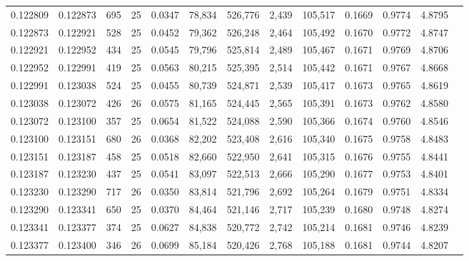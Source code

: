 \begin{tabular}{rrrrrrrrrrrrr}
0.122809 & 0.122873 &   695 &  25 &                                     0.0347 &  78,834 & 526,776 &   2,439 & 105,517 & 0.1669 & 0.9774 & 4.8795 \\
0.122873 & 0.122921 &   528 &  25 &                                     0.0452 &  79,362 & 526,248 &   2,464 & 105,492 & 0.1670 & 0.9772 & 4.8747 \\
0.122921 & 0.122952 &   434 &  25 &                                     0.0545 &  79,796 & 525,814 &   2,489 & 105,467 & 0.1671 & 0.9769 & 4.8706 \\
0.122952 & 0.122991 &   419 &  25 &                                     0.0563 &  80,215 & 525,395 &   2,514 & 105,442 & 0.1671 & 0.9767 & 4.8668 \\
0.122991 & 0.123038 &   524 &  25 &                                     0.0455 &  80,739 & 524,871 &   2,539 & 105,417 & 0.1673 & 0.9765 & 4.8619 \\
0.123038 & 0.123072 &   426 &  26 &                                     0.0575 &  81,165 & 524,445 &   2,565 & 105,391 & 0.1673 & 0.9762 & 4.8580 \\
0.123072 & 0.123100 &   357 &  25 &                                     0.0654 &  81,522 & 524,088 &   2,590 & 105,366 & 0.1674 & 0.9760 & 4.8546 \\
0.123100 & 0.123151 &   680 &  26 &                                     0.0368 &  82,202 & 523,408 &   2,616 & 105,340 & 0.1675 & 0.9758 & 4.8483 \\
0.123151 & 0.123187 &   458 &  25 &                                     0.0518 &  82,660 & 522,950 &   2,641 & 105,315 & 0.1676 & 0.9755 & 4.8441 \\
0.123187 & 0.123230 &   437 &  25 &                                     0.0541 &  83,097 & 522,513 &   2,666 & 105,290 & 0.1677 & 0.9753 & 4.8401 \\
0.123230 & 0.123290 &   717 &  26 &                                     0.0350 &  83,814 & 521,796 &   2,692 & 105,264 & 0.1679 & 0.9751 & 4.8334 \\
0.123290 & 0.123341 &   650 &  25 &                                     0.0370 &  84,464 & 521,146 &   2,717 & 105,239 & 0.1680 & 0.9748 & 4.8274 \\
0.123341 & 0.123377 &   374 &  25 &                                     0.0627 &  84,838 & 520,772 &   2,742 & 105,214 & 0.1681 & 0.9746 & 4.8239 \\
0.123377 & 0.123400 &   346 &  26 &                                     0.0699 &  85,184 & 520,426 &   2,768 & 105,188 & 0.1681 & 0.9744 & 4.8207 \\

\end{tabular}
